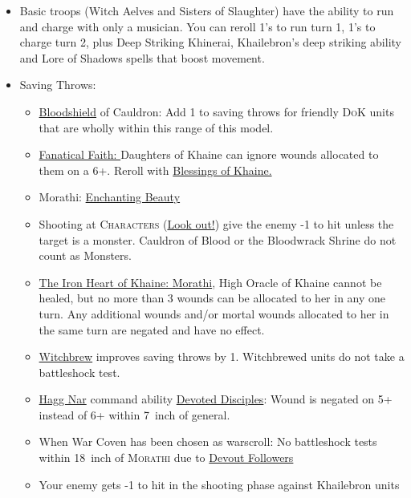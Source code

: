 \begin{itemize}
\item Basic troops (Witch Aelves and Sisters of Slaughter) have the ability to
    run and charge with only a musician.  You can reroll 1's to run turn 1, 1's
        to charge turn 2, plus Deep
        Striking Khinerai, Khailebron's deep striking ability and Lore of
        Shadows spells that boost movement.
\item Saving Throws:
    \begin{itemize}
        \item \hyperref[bloodshield]{Bloodshield} of Cauldron: Add 1 to saving
            throws for friendly \textsc{DoK} units that are wholly within this
            range of this model.
        \item \hyperref[fanatical-faith]{Fanatical Faith: }Daughters of Khaine
            can ignore wounds allocated to them on a 6+. Reroll with
            \hyperref[blessing-of-khaine]{Blessings of Khaine.}
        \item Morathi: \hyperref[enchanting-beauty]{Enchanting Beauty}
        \item  Shooting at \textsc{Characters} (\hyperref[corerule:look-out-sir]{Look
            out!}) give the enemy -1 to hit unless the target is a monster.
            Cauldron of Blood  or the Bloodwrack Shrine do not
            count as Monsters. 
        \item \hyperref[the-iron-heart-of-khaine]{The Iron Heart of Khaine:
            Morathi}, High Oracle of Khaine cannot be healed, but no more than
            3 wounds can be allocated to her in any one turn. Any additional
            wounds and/or mortal wounds allocated to her in the same turn are
            negated and have no effect.
        \item \hyperref[witchbrew]{Witchbrew} improves saving throws by 1. Witchbrewed
            units do not take a battleshock test.
        \item \hyperref[hagg-nar]{Hagg Nar} command ability
            \hyperref[devoted-disciples]{Devoted Disciples}: Wound is negated
            on 5+ instead of 6+ within 7~inch of general.
        \item When War Coven has been chosen as warscroll: No battleshock tests
            within 18~inch of \textsc{Morathi} due to \hyperref[devout-followers]{Devout
            Followers}
        \item Your enemy gets -1 to hit in the shooting phase against
            Khailebron units
    \end{itemize}
\end{itemize}

